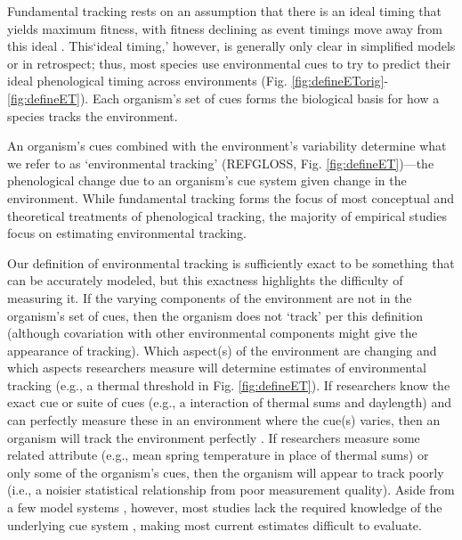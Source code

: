 \documentclass[11pt,letterpaper]{article}
\begin{document}
Fundamental tracking rests on an assumption that there is an ideal timing that yields maximum fitness, with fitness declining as event timings move away from this ideal \citep[a foundational concept of the trophic mismatch literature,][]{vissergienapp2019}. This`ideal timing,' however, is generally only clear in simplified models or in retrospect; thus, most species use environmental cues to try to predict their ideal phenological timing across environments (Fig. \ref{fig:defineETorig}-\ref{fig:defineET}). Each organism's set of cues forms the biological basis for how a species tracks the environment.

An organism's cues combined with the environment's variability determine what we refer to as `environmental tracking' (REFGLOSS, Fig. \ref{fig:defineET})---the phenological change due to an organism's cue system given change in the environment. While fundamental tracking forms the focus of most conceptual and theoretical treatments of phenological tracking, the majority of  empirical studies focus on estimating environmental tracking. 

Our definition of environmental tracking is sufficiently exact to be something that can be accurately modeled, but this exactness highlights the difficulty of measuring it. If the varying components of the environment are not in the organism's set of cues, then the organism does not `track' per this definition (although covariation with other environmental components might give the appearance of tracking).  Which aspect(s) of the environment are changing and which aspects researchers measure will determine estimates of environmental tracking (e.g., a thermal threshold in Fig. \ref{fig:defineET}). If researchers know the exact cue or suite of cues (e.g., a interaction of thermal sums and daylength) and can perfectly measure these in an environment where the cue(s) varies, then an organism will track the environment perfectly \citep[e.g., photothermal for \emph{Arabidopsisis}][]{Wilczek:2009oa}. If researchers measure some related attribute (e.g., mean spring temperature in place of thermal sums) or only some of the organism's cues, then the organism will appear to track poorly (i.e., a noisier statistical relationship from poor measurement quality).  Aside from a few model systems \citep[e.g.,][]{Wilczek:2009oa,satake2013}, however, most studies lack the required knowledge of the underlying cue system \citep{chmura2019}, making most current estimates difficult to evaluate. %
\end{document}
